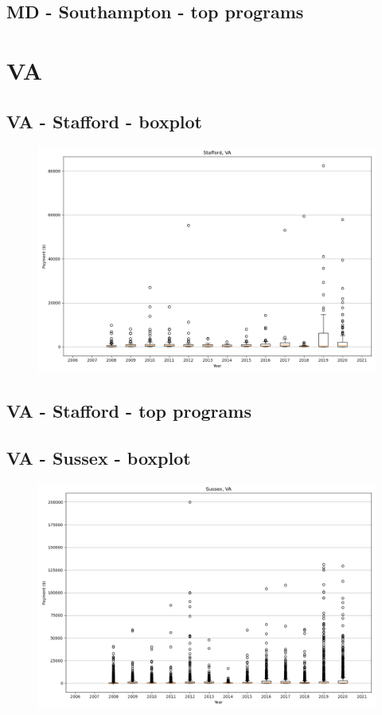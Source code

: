 \subsection*{MD - Southampton - top programs}

\newpage
\section*{VA}
\subsection*{VA - Stafford - boxplot}
\begin{figure}[h]
\centering
\includegraphics[width=7in]{../output/boxplots/counties/Stafford-VA_boxplot.png}
\end{figure}


\subsection*{VA - Stafford - top programs}

\newpage
\subsection*{VA - Sussex - boxplot}
\begin{figure}[h]
\centering
\includegraphics[width=7in]{../output/boxplots/counties/Sussex-VA_boxplot.png}
\end{figure}


